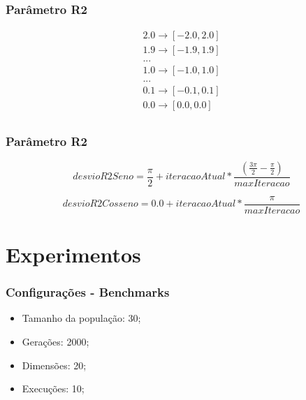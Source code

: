 \documentclass{beamer}
\begin{document}
\begin{frame}
\frametitle{Parâmetro R2}
\begin{equation}
\label{eq:mapeamento}
  \begin{gathered}
    2.0 \rightarrow [-2.0, 2.0]\\
    1.9 \rightarrow [-1.9, 1.9]\\
    ...\\
    1.0 \rightarrow [-1.0, 1.0]\\
    ...\\
    0.1 \rightarrow [-0.1, 0.1]\\
    0.0 \rightarrow [0.0, 0.0]\\
 \end{gathered}
\end{equation}
\end{frame}


\begin{frame}
\frametitle{Parâmetro R2}
\begin{equation}
    \label{eq:desvioR2Sin}
    desvioR2Seno = \frac{\pi}{2} + iteracaoAtual * \frac{(\frac{3\pi}{2}-\frac{\pi}{2})}{maxIteracao}
\end{equation}

\begin{equation}
    \label{eq:desvioR2Cos}
    desvioR2Cosseno = 0.0 + iteracaoAtual * \frac{\pi}{maxIteracao}
\end{equation}
\end{frame}

\section{Experimentos}

\begin{frame}
\frametitle{Configurações - Benchmarks}
\begin{itemize}
    \item Tamanho da população: 30;
    \item Gerações: 2000;
    \item Dimensões: 20;
    \item Execuções: 10;
\end{itemize}
\end{frame}
\end{document}
